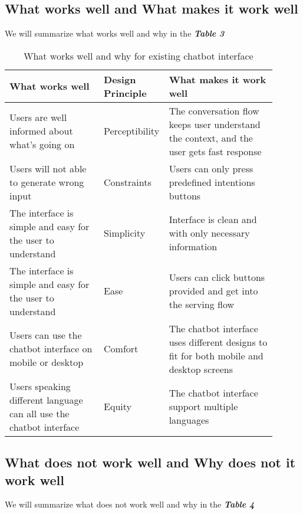\documentclass[
	letterpaper, %
]{jdf}
\begin{document}
\subsection{What works well and What makes it work well}
We will summarize what works well and why in the \textit{\textbf{Table 3}}
\begin{table}[hbt!] %
	\caption{What works well and why for existing chatbot interface}
	\small %
	\centering %
	\begin{tabular}{L{0.35\linewidth} L{0.15\linewidth} L{0.4\linewidth}}
		\textbf{What works well} & \textbf{Design Principle} & \textbf{What makes it work well} \\
		\toprule[0.5pt]
		Users are well informed about what's going on & Perceptibility & The conversation flow keeps user understand the context, and the user gets fast response \\
		\midrule
		Users will not able to generate wrong input & Constraints & Users can only press predefined intentions buttons \\
		\midrule
		The interface is simple and easy for the user to understand & Simplicity & Interface is clean and with only necessary information \\
		\midrule
		The interface is simple and easy for the user to understand & Ease & Users can click buttons provided and get into the serving flow \\
		\midrule
		Users can use the chatbot interface on mobile or desktop & Comfort & The chatbot interface uses different designs to fit for both mobile and desktop screens \\
		\midrule
		Users speaking different language can all use the chatbot interface & Equity & The chatbot interface support multiple languages \\
	\end{tabular}
\end{table}
\subsection{What does not work well and Why does not it work well}
We will summarize what does not work well and why in the \textit{\textbf{Table 4}}
\end{document}
